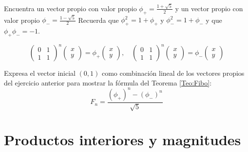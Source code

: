 \begin{ejercicio}
Encuentra un vector propio con valor propio $\phi_+=\frac{1+\sqrt{5}}{2}$ y un vector propio con valor propio $\phi_-=\frac{1-\sqrt{5}}{2}$ Recuerda que $\phi_+^2=1+\phi_+$ y $\phi_-^2=1+\phi_-$ y que $\phi_+\phi_-=-1$.

$$
\left(\begin{array}{cc}
0&1 \\
1&1
\end{array}\right)^n
\left(\begin{array}{c}
x \\
y
\end{array}\right)
= \phi_+
\left(\begin{array}{c}
x \\
y
\end{array}\right)
,\quad
\left(\begin{array}{cc}
0&1 \\
1&1
\end{array}\right)^n
\left(\begin{array}{c}
x \\
y
\end{array}\right)
= \phi_-
\left(\begin{array}{c}
x \\
y
\end{array}\right)
$$
\end{ejercicio}

\begin{ejercicio}
Expresa el vector inicial $(0,1)$ como combinación lineal de los vectores propios del ejercicio anterior para mostrar la fórmula del Teorema \ref{Teo:Fibo}: 
\begin{equation}
F_n=\frac{(\phi_+)^n-(\phi_-)^n}{\sqrt{5}}
\end{equation}
\end{ejercicio}

\newpage

\section{Productos interiores y magnitudes}

